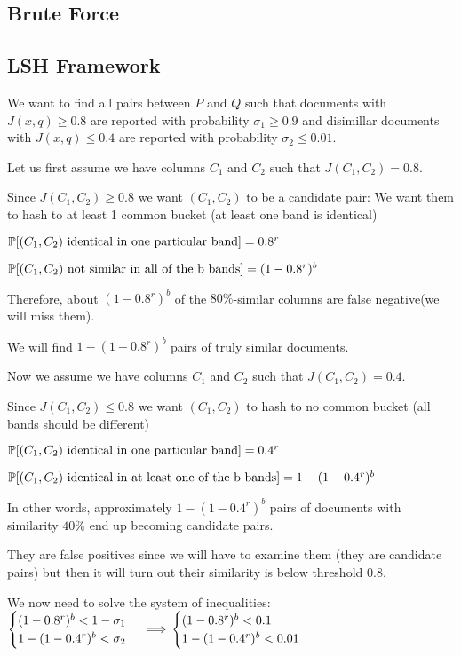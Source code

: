 \subsection{Brute Force}

\subsection{LSH Framework}
We want to find all pairs between $P$ and $Q$ such that documents with $J(x,q) \ge 0.8$ are reported with probability $\sigma_1\ge 0.9$ and disimillar documents with $J(x,q) \le 0.4$ are reported with probability $\sigma_2\le 0.01$.

Let us first assume we have columns $C_1$ and $C_2$ such that $J(C_1,C_2)=0.8$.

Since $J(C_1,C_2)\ge 0.8$ we want $(C_1,C_2)$ to be a candidate pair: We want them to hash to at least 1 common bucket (at least one band is identical)

$\P{(C_1,C_2) \text{ identical in one particular band}} = 0.8^r$

$\P{(C_1,C_2) \text{ not similar in all of the b bands}} = (1-0.8^r)^b$

Therefore, about $(1-0.8^r)^b$ of the $80\%$-similar columns are false negative(we will miss them).

We will find $1-(1-0.8^r)^b$ pairs of truly similar documents.

Now we assume we have columns $C_1$ and $C_2$ such that $J(C_1,C_2)=0.4$.

Since $J(C_1,C_2)\le 0.8$ we want $(C_1,C_2)$ to hash to no common bucket (all bands should be different)

$\P{(C_1,C_2) \text{ identical in one particular band}} = 0.4^r$

$\P{(C_1,C_2) \text{ identical in at least one of the b bands}} = 1 - (1-0.4^r)^b$

In other words, approximately $ 1 - (1-0.4^r)^b$ pairs of documents with similarity $40\%$ end up becoming candidate pairs.

They are false positives since we will have to examine them (they are candidate pairs) but then it will turn out their similarity is below threshold 0.8.

We now need to solve the system of inequalities:
$
\begin{cases}
	(1-0.8^r)^b<1-\sigma_1\\
	1 - (1-0.4^r)^b<\sigma_2
\end{cases}
\implies\\
\begin{cases}
	(1-0.8^r)^b<0.1\\
	1 - (1-0.4^r)^b<0.01
\end{cases}
$


